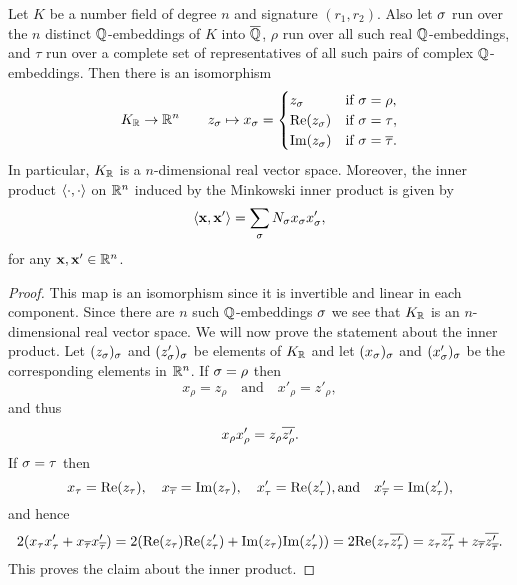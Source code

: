     \begin{proposition}\label{prop:Minkowski_space_isomorphism}
      Let $K$ be a number field of degree $n$ and signature $(r_{1},r_{2})$. Also let $\sigma$ run over the $n$ distinct $\mathbb{Q}$-embeddings of $K$ into $\overline{\mathbb{Q}}$, $\rho$ run over all such real $\mathbb{Q}$-embeddings, and $\tau$ run over a complete set of representatives of all such pairs of complex $\mathbb{Q}$-embeddings. Then there is an isomorphism
      \[
        K_{\mathbb{R}} \to \mathbb{R}^{n} \qquad z_{\sigma} \mapsto x_{\sigma} = \begin{cases} z_{\sigma} & \text{if $\sigma = \rho$}, \\ \mathrm{Re}(z_{\sigma}) & \text{if $\sigma = \tau$}, \\ \mathrm{Im}(z_{\sigma}) & \text{if $\sigma = \overline{\tau}$}. \end{cases}
      \]
      In particular, $K_{\mathbb{R}}$ is a $n$-dimensional real vector space. Moreover, the inner product $\langle\cdot,\cdot\rangle$ on $\mathbb{R}^{n}$ induced by the Minkowski inner product is given by
      \[
        \langle\mathbf{x},\mathbf{x}'\rangle = \sum_{\sigma}N_{\sigma}x_{\sigma}x'_{\sigma},
      \]
      for any $\mathbf{x},\mathbf{x}' \in \mathbb{R}^{n}$.
    \end{proposition}
    \begin{proof}
      This map is an isomorphism since it is invertible and linear in each component. Since there are $n$ such $\mathbb{Q}$-embeddings $\sigma$ we see that $K_{\mathbb{R}}$ is an $n$-dimensional real vector space. We will now prove the statement about the inner product. Let $(z_{\sigma})_{\sigma}$ and $(z'_{\sigma})_{\sigma}$ be elements of $K_{\mathbb{R}}$ and let $(x_{\sigma})_{\sigma}$ and $(x'_{\sigma})_{\sigma}$ be the corresponding elements in $\mathbb{R}^{n}$. If $\sigma = \rho$ then
      \[
        x_{\rho} = z_{\rho} \quad \text{and} \quad x'_{\rho} = z'_{\rho},
      \]
      and thus
      \[
        x_{\rho}x'_{\rho} = z_{\rho}\overline{z'_{\rho}}.
      \]
      If $\sigma = \tau$ then
      \[
        x_{\tau} = \mathrm{Re}(z_{\tau}), \quad x_{\overline{\tau}} = \mathrm{Im}(z_{\tau}), \quad x'_{\tau} = \mathrm{Re}(z'_{\tau}), \text{and} \quad x'_{\overline{\tau}} = \mathrm{Im}(z'_{\tau}),
      \]
      and hence
      \[
        2(x_{\tau}x'_{\tau}+x_{\overline{\tau}}x'_{\overline{\tau}}) = 2(\mathrm{Re}(z_{\tau})\mathrm{Re}(z'_{\tau})+\mathrm{Im}(z_{\tau})\mathrm{Im}(z'_{\tau})) = 2\mathrm{Re}(z_{\tau}\overline{z'_{\tau}}) = z_{\tau}\overline{z'_{\tau}}+z_{\overline{\tau}}\overline{z'_{\overline{\tau}}}.
      \]
      This proves the claim about the inner product.
    \end{proof}
    
